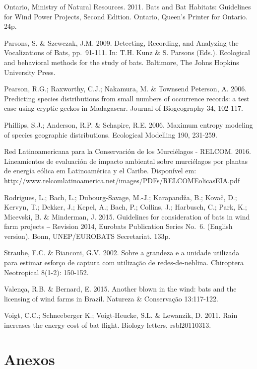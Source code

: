 \documentclass[
]{scrbook}
\begin{document}
Ontario, Ministry of Natural Resources. 2011. Bats and Bat Habitats: Guidelines for Wind Power Projects, Second Edition. Ontario, Queen's Printer for Ontario. 24p.

Parsons, S. \& Szewczak, J.M. 2009. Detecting, Recording, and Analyzing the Vocalizations of Bats, pp.~91-111. In: T.H. Kunz \& S. Parsons (Eds.). Ecological and behavioral methods for the study of bats. Baltimore, The Johns Hopkins University Press.

Pearson, R.G.; Raxworthy, C.J.; Nakamura, M. \& Townsend Peterson, A. 2006. Predicting species distributions from small numbers of occurrence records: a test case using cryptic geckos in Madagascar. Journal of Biogeography 34, 102-117.

Phillips, S.J.; Anderson, R.P. \& Schapire, R.E. 2006. Maximum entropy modeling of species geographic distributions. Ecological Modelling 190, 231-259.

Red Latinoamericana para la Conservación de los Murciélagos - RELCOM. 2016. Lineamientos de evaluación de impacto ambiental sobre murciélagos por plantas de energía eólica em Latinoamérica y el Caribe. Disponível em: \url{http://www.relcomlatinoamerica.net/images/PDFs/RELCOMEolicasEIA.pdf}

Rodrigues, L.; Bach, L.; Dubourg-Savage, M.-J.; Karapandža, B.; Kovač, D.; Kervyn, T.; Dekker, J.; Kepel, A.; Bach, P.; Collins, J.; Harbusch, C.; Park, K.; Micevski, B. \& Minderman, J. 2015. Guidelines for consideration of bats in wind farm projects ‒ Revision 2014, Eurobats Publication Series No.~6. (English version). Bonn, UNEP/EUROBATS Secretariat. 133p.

Straube, F.C. \& Bianconi, G.V. 2002. Sobre a grandeza e a unidade utilizada para estimar esforço de captura com utilização de redes-de-neblina. Chiroptera Neotropical 8(1-2): 150-152.

Valença, R.B. \& Bernard, E. 2015. Another blown in the wind: bats and the licensing of wind farms in Brazil. Natureza \& Conservação 13:117-122.

Voigt, C.C.; Schneeberger K.; Voigt-Heucke, S.L. \& Lewanzik, D. 2011. Rain increases the energy cost of bat flight. Biology letters, rsbl20110313.

\hypertarget{anexos}{%
\chapter*{Anexos}\label{anexos}}
\end{document}
